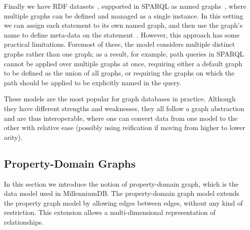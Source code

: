 
Finally we have RDF datasets~\cite{CyganiakWL14}, supported in SPARQL as named graphs~\cite{HarrisS13}, where multiple graphs can be defined and managed as a single instance. In this setting we can assign each statement to its own named graph, and then use the graph's name to define meta-data on the statement~\cite{HernandezHK15}. However, this approach has some practical limitations. Foremost of these, the model considers multiple distinct graphs rather than one graph; as a result, for example, path queries in SPARQL cannot be applied over multiple graphs at once, requiring either a default graph to be defined as the union of all graphs, or requiring the graphs on which the path should be applied to be explicitly named in the query.


These models are the most popular for graph databases in practice. Although they have different strengths and weaknesses, they all follow a graph abstraction and are thus interoperable, where one can convert data from one model to the other with relative ease (possibly using reification if moving from higher to lower arity). 

\subsection{Property-Domain Graphs}
\label{sec-proposal}
In this section we introduce the notion of property-domain graph, which is the data model used in MillenniumDB.
The property-domain graph model extends the property graph model by allowing edges between edges, without any kind of restriction. This extension allows a multi-dimensional representation of relationships. 

